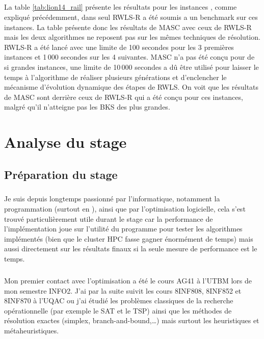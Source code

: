 \documentclass[a4paper,11pt,twoside,french,report]{../common/simplem}
\begin{document}
				\paragraph*{}
					La table \ref{tab:lion14_rail} présente les résultats pour les instances , comme expliqué précédemment, dans \cite{Gao2015} seul \gls{RWLS}-R a été soumis a un benchmark sur ces instances. La table présente donc les résultats de \gls{MASC} avec ceux de \gls{RWLS}-R mais les deux algorithmes ne reposent pas sur les mêmes techniques de résolution. \gls{RWLS}-R a été lancé avec une limite de 100 secondes pour les 3 premières instances et 1\,000 secondes sur les 4 suivantes. \gls{MASC} n'a pas été conçu pour de si grandes instances, une limite de 10\,000 secondes a dû être utilisé pour laisser le temps à l'algorithme de réaliser plusieurs générations et d'enclencher le mécanisme d'évolution dynamique des étapes de \gls{RWLS}. On voit que les résultats de \gls{MASC} sont derrière ceux de \gls{RWLS}-R qui a été conçu pour ces instances, malgré qu'il n'atteigne pas les \gls{BKS} des plus grandes.
				\paragraph*{}
					
	\chapter{Analyse du stage}
		\section{Préparation du stage}
			\paragraph*{}
				Je suis depuis longtemps passionné par l'informatique, notamment la programmation (surtout en \Cpp{}), ainsi que par l'optimisation logicielle, cela s’est trouvé particulièrement utile durant le stage car la performance de l'implémentation joue sur l'utilité du programme pour tester les algorithmes implémentés (bien que le cluster \gls{HPC} fasse gagner énormément de temps) mais aussi directement sur les résultats finaux si la seule mesure de performance est le temps.
			\paragraph*{}
				Mon premier contact avec l'optimisation a été le cours \gls{AG41} à l'\gls{UTBM} lors de mon semestre INFO2. J'ai par la suite suivit les cours \gls{8INF808}, \gls{8INF852} et \gls{8INF870} à l'\gls{UQAC} ou j'ai étudié les problèmes classiques de la recherche opérationnelle (par exemple le \gls{SAT} et le \gls{TSP}) ainsi que les méthodes de résolution exactes (simplex, branch-and-bound,\ldots) mais surtout les heuristiques et métaheuristiques.
\end{document}
